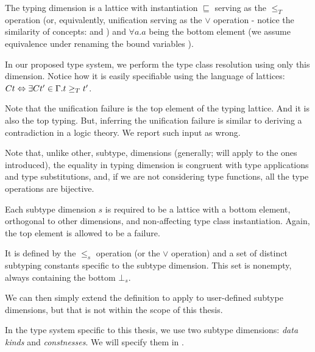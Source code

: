 \begin{defn}
    \label{typing_def}
    The typing dimension is a lattice with instantiation $\sqsubseteq$ serving as the $\leq_T$ operation (or, equivalently, unification serving as the $\lor$ operation - notice the similarity of concepts:  and ) and $\forall a . a$ being the bottom element (we assume equivalence under renaming the bound variables ).

    In our proposed type system, we perform the type class resolution using only this dimension. Notice how it is easily specifiable using the language of lattices: $C t \Leftrightarrow \exists C t' \in \Gamma . t \geq_T t'$.
\end{defn}

\begin{remark}
    Note that the unification failure is the top element of the typing lattice. And it is also the top typing. But, inferring the unification failure is similar to deriving a contradiction in a logic theory. We report such input as wrong.
\end{remark}

\begin{remark}
    Note that, unlike other, subtype, dimensions (generally; will apply to the ones introduced), the equality in typing dimension is congruent with type applications and type substitutions, and, if we are not considering type functions, all the type operations are bijective.
\end{remark}

\begin{defn}
    Each subtype dimension $s$ is required to be a lattice with a bottom element, orthogonal to other dimensions, and non-affecting type class instantiation. Again, the top element is allowed to be a failure.

    It is defined by the $\leq_s$ operation (or the $\lor$ operation) and a set of distinct subtyping constants specific to the subtype dimension. This set is nonempty, always containing the bottom $\bot_s$.

    We can then simply extend the definition to apply to user-defined subtype dimensions, but that is not within the scope of this thesis.

    In the type system specific to this thesis, we use two subtype dimensions: \textit{data kinds} and \textit{constnesses}. We will specify them in .
\end{defn}

